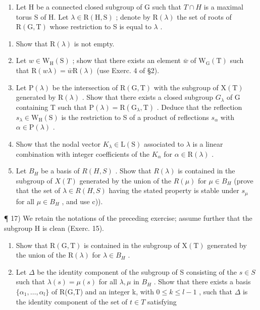 \begin{enumerate}
\def\labelenumi{\arabic{enumi})}
\setcounter{enumi}{15}
\tightlist
\item
  Let H be a connected closed subgroup of G such that \(T \cap H\) is a maximal torus S of H. Let \(\lambda \in \mathrm{R}(\mathrm{H}, \mathrm{S})\) ; denote by \(\mathrm{R}(\lambda)\) the set of roots of \(\mathrm{R}(\mathrm{G}, \mathrm{T})\) whose restriction to S is equal to \(\lambda\) .
\end{enumerate}

\begin{enumerate}
\def\labelenumi{\alph{enumi})}
\item
  Show that \(\mathrm{R}(\lambda)\) is not empty.
\item
  Let \(w \in \mathrm{W}_{\mathrm{H}}(\mathrm{S})\) ; show that there exists an element \(\bar{w}\) of \(\mathrm{W}_{\mathrm{G}}(\mathrm{T})\) such that \(\mathrm{R}(w\lambda) = \bar{w}\mathrm{R}(\lambda)\) (use Exerc. 4 of §2).
\item
  Let \(\mathrm{P}(\lambda)\) be the intersection of \(\mathrm{R}(\mathrm{G},\mathrm{T})\) with the subgroup of \(\mathrm{X}(\mathrm{T})\) generated by \(\mathrm{R}(\lambda)\) . Show that there exists a closed subgroup \(G_{\lambda}\) of G containing T such that \(\mathrm{P}(\lambda)=\mathrm{R}(\mathrm{G}_{\lambda},\mathrm{T})\) . Deduce that the reflection \(s_{\lambda}\in\mathrm{W}_{\mathrm{H}}(\mathrm{S})\) is the restriction to S of a product of reflections \(s_{\alpha}\) with \(\alpha\in\mathrm{P}(\lambda)\) .
\item
  Show that the nodal vector \(K_{\lambda} \in \mathrm{L}(\mathrm{S})\) associated to \(\lambda\) is a linear combination with integer coefficients of the \(K_{\alpha}\) for \(\alpha \in \mathrm{R}(\lambda)\) .
\item
  Let \(B_{H}\) be a basis of \(R(H,S)\) . Show that \(R(\lambda)\) is contained in the subgroup of \(X(T)\) generated by the union of the \(R(\mu)\) for \(\mu \in B_{H}\) (prove that the set of \(\lambda \in R(H,S)\) having the stated property is stable under \(s_{\mu}\) for all \(\mu \in B_{H}\) , and use c)).
\end{enumerate}

¶ 17) We retain the notations of the preceding exercise; assume further that the subgroup H is clean (Exerc. 15).

\begin{enumerate}
\def\labelenumi{\alph{enumi})}
\item
  Show that \(\mathrm{R}(\mathrm{G},\mathrm{T})\) is contained in the subgroup of \(\mathrm{X}(\mathrm{T})\) generated by the union of the \(\mathrm{R}(\lambda)\) for \(\lambda\in B_{H}\) .
\item
  Let \(\Delta\) be the identity component of the subgroup of S consisting of the \(s \in S\) such that \(\lambda(s) = \mu(s)\) for all \(\lambda, \mu\) in \(B_{H}\) . Show that there exists a basis \(\{\alpha_{1}, \ldots, \alpha_{l}\}\) of R(G,T) and an integer k, with \(0 \leq k \leq l - 1\) , such that \(\Delta\) is the identity component of the set of \(t \in T\) satisfying
\end{enumerate}

